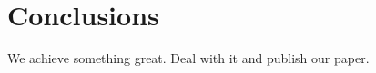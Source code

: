 \section{Conclusions}\label{sec:conclusions}
We achieve something great.
Deal with it and publish our paper.